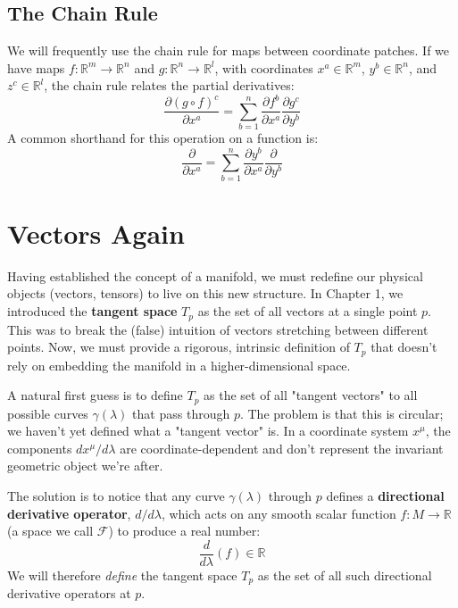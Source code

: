 \documentclass[11pt, a4paper]{report}
\begin{document}
\subsection*{The Chain Rule}
We will frequently use the chain rule for maps between coordinate patches.
% 
% 
% 
% 
% 
% 
% 
% 
% 
% 
% 
% 
% 
% 
% 
If we have maps $f: \mathbb{R}^m \to \mathbb{R}^n$ and $g: \mathbb{R}^n \to \mathbb{R}^l$, with coordinates $x^a \in \mathbb{R}^m$, $y^b \in \mathbb{R}^n$, and $z^c \in \mathbb{R}^l$, the chain rule relates the partial derivatives:
\begin{equation}
    \frac{\partial (g \circ f)^c}{\partial x^a} = \sum_{b=1}^n \frac{\partial f^b}{\partial x^a} \frac{\partial g^c}{\partial y^b}
\end{equation}
A common shorthand for this operation on a function is:
\begin{equation}
    \frac{\partial}{\partial x^a} = \sum_{b=1}^n \frac{\partial y^b}{\partial x^a} \frac{\partial}{\partial y^b}
\end{equation}

\section{Vectors Again}

Having established the concept of a manifold, we must redefine our physical objects (vectors, tensors) to live on this new structure. In Chapter 1, we introduced the \textbf{tangent space} $T_p$ as the set of all vectors at a single point $p$. This was to break the (false) intuition of vectors stretching between different points. Now, we must provide a rigorous, intrinsic definition of $T_p$ that doesn't rely on embedding the manifold in a higher-dimensional space.

A natural first guess is to define $T_p$ as the set of all "tangent vectors" to all possible curves $\gamma(\lambda)$ that pass through $p$. The problem is that this is circular; we haven't yet defined what a "tangent vector" is. In a coordinate system $x^\mu$, the components $dx^\mu/d\lambda$ are coordinate-dependent and don't represent the invariant geometric object we're after.

The solution is to notice that any curve $\gamma(\lambda)$ through $p$ defines a \textbf{directional derivative operator}, $d/d\lambda$, which acts on any smooth scalar function $f: M \to \mathbb{R}$ (a space we call $\mathcal{F}$) to produce a real number:
\[
    \frac{d}{d\lambda} (f) \in \mathbb{R}
\]
We will therefore \emph{define} the tangent space $T_p$ as the set of all such directional derivative operators at $p$.
\end{document}
